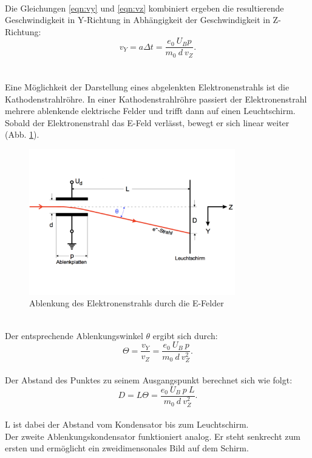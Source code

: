 \\Die Gleichungen \eqref{eqn:vy} und \eqref{eqn:vz} kombiniert ergeben die resultierende Geschwindigkeit in Y-Richtung in Abhängigkeit der Geschwindigkeit in Z-Richtung:
\begin{equation*}
  v_{Y}=a \Delta t=\frac{e_{0}\:U_{B}p}{m_{0}\:d \:v_{Z}}.
\end{equation*}
\\
\\Eine Möglichkeit der Darstellung eines abgelenkten Elektronenstrahls ist die Kathodenstrahlröhre.
In einer Kathodenstrahlröhre passiert der Elektronenstrahl mehrere ablenkende elektrische Felder und trifft dann auf einen Leuchtschirm.
Sobald der Elektronenstrahl das E-Feld verlässt, bewegt er sich linear weiter (Abb. \ref{fig:ablenkung}).
\begin{figure}[h!]
  \centering
  \includegraphics[width=0.8\textwidth]{EFeld2.pdf}
  \caption{Ablenkung des Elektronenstrahls durch die E-Felder \cite{1}}
  \label{fig:ablenkung}
\end{figure}
\\Der entsprechende Ablenkungswinkel $\theta$ ergibt sich durch:
\begin{equation*}
  \Theta = \frac{v_{Y}}{v_{Z}}=\frac{e_{0}\:U_{B}\:p}{m_{0}\:d \:v_{Z}^2}.
\end{equation*}
\\Der Abstand des Punktes zu seinem Ausgangspunkt berechnet sich wie folgt:
\begin{equation*}
  D= L \Theta = \frac{e_{0}\:U_{B}\:p \:L}{m_{0}\:d\: v_{Z}^2}.
\end{equation*}
\\L ist dabei der Abstand vom Kondensator bis zum Leuchtschirm.
\\Der zweite Ablenkungskondensator funktioniert analog. Er steht senkrecht zum ersten und ermöglicht ein zweidimensonales Bild auf dem Schirm.
